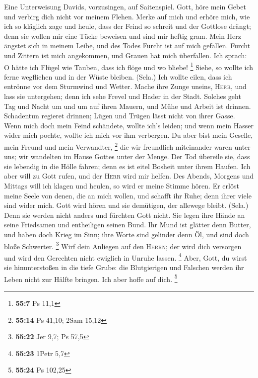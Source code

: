 Eine Unterweisung Davids, vorzusingen, auf Saitenspiel. 
Gott, höre mein Gebet und verbirg dich nicht vor meinem Flehen.
 Merke auf mich und erhöre mich, wie ich so kläglich zage
und heule,  dass der Feind so schreit und der Gottlose
drängt; denn sie wollen mir eine Tücke beweisen und sind mir heftig
gram.  Mein Herz ängstet sich in meinem Leibe, und des
Todes Furcht ist auf mich gefallen.  Furcht und Zittern
ist mich angekommen, und Grauen hat mich überfallen.  Ich
sprach: O hätte ich Flügel wie Tauben, dass ich flöge und wo bliebe!
\footnote{\textbf{55:7} Ps 11,1}  Siehe, so wollte ich
ferne wegfliehen und in der Wüste bleiben. (Sela.)  Ich
wollte eilen, dass ich entrönne vor dem Sturmwind und Wetter.
 Mache ihre Zunge uneins, \textsc{Herr}, und lass sie
untergehen; denn ich sehe Frevel und Hader in der Stadt. 
Solches geht Tag und Nacht um und um auf ihren Mauern, und Mühe und
Arbeit ist drinnen.  Schadentun regieret drinnen; Lügen
und Trügen lässt nicht von ihrer Gasse.  Wenn mich doch
mein Feind schändete, wollte ich's leiden; und wenn mein Hasser wider
mich pochte, wollte ich mich vor ihm verbergen.  Du aber
bist mein Geselle, mein Freund und mein Verwandter, \footnote{\textbf{55:14}
  Ps 41,10; 2Sam 15,12}  die wir freundlich miteinander
waren unter uns; wir wandelten im Hause Gottes unter der Menge.
 Der Tod übereile sie, dass sie lebendig in die Hölle
fahren; denn es ist eitel Bosheit unter ihrem Haufen. 
Ich aber will zu Gott rufen, und der \textsc{Herr} wird mir helfen.
 Des Abends, Morgens und Mittags will ich klagen und
heulen, so wird er meine Stimme hören.  Er erlöst meine
Seele von denen, die an mich wollen, und schafft ihr Ruhe; denn ihrer
viele sind wider mich.  Gott wird hören und sie
demütigen, der allewege bleibt. (Sela.) Denn sie werden nicht anders und
fürchten Gott nicht.  Sie legen ihre Hände an seine
Friedsamen und entheiligen seinen Bund.  Ihr Mund ist
glätter denn Butter, und haben doch Krieg im Sinn; ihre Worte sind
gelinder denn Öl, und sind doch bloße Schwerter. \footnote{\textbf{55:22}
  Jer 9,7; Ps 57,5}  Wirf dein Anliegen auf den
\textsc{Herrn}; der wird dich versorgen und wird den Gerechten nicht
ewiglich in Unruhe lassen. \footnote{\textbf{55:23} 1Petr 5,7}
 Aber, Gott, du wirst sie hinunterstoßen in die tiefe
Grube: die Blutgierigen und Falschen werden ihr Leben nicht zur Hälfte
bringen. Ich aber hoffe auf dich. \footnote{\textbf{55:24} Ps 102,25}

